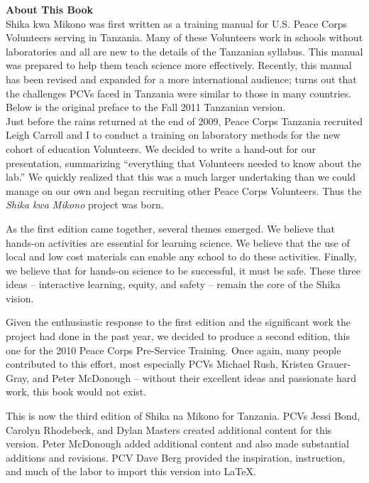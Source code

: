 \textbf{\huge{About This Book}}\\[12pt]

Shika kwa Mikono was first written as a training manual for U.S. Peace Corps Volunteers serving in Tanzania. Many of these Volunteers work in schools without laboratories and all are new to the details of the Tanzanian syllabus. This manual was prepared to help them teach science more effectively. Recently, this manual has been revised and expanded for a more international audience; turns out that the challenges PCVs faced in Tanzania were similar to those in many countries. Below is the original preface to the Fall 2011 Tanzanian version.\\[12pt]

Just before the rains returned at the end of 2009, 
Peace Corps Tanzania recruited Leigh Carroll and I 
to conduct a training on laboratory methods 
for the new cohort of education Volunteers. 
We decided to write a hand-out for our presentation, 
summarizing ``everything that Volunteers needed to know about the lab.'' 
We quickly realized that this was a much larger undertaking 
than we could manage on our own 
and began recruiting other Peace Corps Volunteers. 
Thus the \textit{Shika kwa Mikono} project was born.

As the first edition came together, several themes emerged. 
We believe that hands-on activities are essential for learning science. 
We believe that the use of local and low cost materials 
can enable any school to do these activities. 
Finally, we believe that for hands-on science to be successful, 
it must be safe. 
These three ideas -- interactive learning, equity, and safety -- 
remain the core of the Shika vision.

Given the enthusiastic response to the first edition 
and the significant work the project had done in the past year, 
we decided to produce a second edition, 
this one for the 2010 Peace Corps Pre-Service Training. 
Once again, many people contributed to this effort, 
most especially PCVs Michael Rush, Kristen Grauer-Gray, and Peter McDonough 
-- without their excellent ideas and passionate hard work, 
this book would not exist.

This is now the third edition of Shika na Mikono for Tanzania.
PCVs Jessi Bond, Carolyn Rhodebeck, and Dylan Masters 
created additional content for this version. Peter McDonough 
added additional content and also made substantial additions and revisions. 
PCV Dave Berg provided the inspiration, instruction, 
and much of the labor to import this version into \LaTeX.

